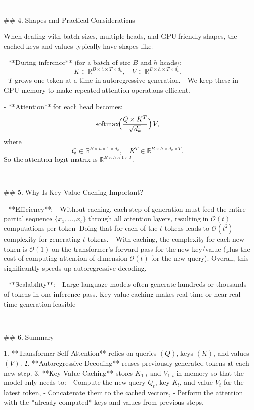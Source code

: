 ---

## 4. Shapes and Practical Considerations

When dealing with batch sizes, multiple heads, and GPU-friendly shapes, the cached keys and values typically have shapes like:

- **During inference** (for a batch of size \(B\) and \(h\) heads):
  \[
  K \in \mathbb{R}^{B \times h \times T \times d_k}, \quad
  V \in \mathbb{R}^{B \times h \times T \times d_k}.
  \]
  - \(T\) grows one token at a time in autoregressive generation.  
  - We keep these in GPU memory to make repeated attention operations efficient.

- **Attention** for each head becomes:
  \[
  \mathrm{softmax}\!\Bigl(\frac{Q \times K^T}{\sqrt{d_k}}\Bigr)\, V,
  \]
  where
  \[
  Q \in \mathbb{R}^{B \times h \times 1 \times d_k}, \quad
  K^T \in \mathbb{R}^{B \times h \times d_k \times T}.
  \]
  So the attention logit matrix is \(\mathbb{R}^{B \times h \times 1 \times T}\).

---

## 5. Why Is Key-Value Caching Important?

- **Efficiency**:  
  - Without caching, each step of generation must feed the entire partial sequence \(\{x_1, \ldots, x_t\}\) through all attention layers, resulting in \(\mathcal{O}(t)\) computations per token. Doing that for each of the \(t\) tokens leads to \(\mathcal{O}(t^2)\) complexity for generating \(t\) tokens.
  - With caching, the complexity for each new token is \(\mathcal{O}(1)\) on the transformer's forward pass for the new key/value (plus the cost of computing attention of dimension \(\mathcal{O}(t)\) for the new query). Overall, this significantly speeds up autoregressive decoding.

- **Scalability**:  
  - Large language models often generate hundreds or thousands of tokens in one inference pass. Key-value caching makes real-time or near real-time generation feasible.

---

## 6. Summary

1. **Transformer Self-Attention** relies on queries \((Q)\), keys \((K)\), and values \((V)\).
2. **Autoregressive Decoding** reuses previously generated tokens at each new step.
3. **Key-Value Caching** stores \(K_{1:t}\) and \(V_{1:t}\) in memory so that the model only needs to:
   - Compute the new query \(Q_t\), key \(K_t\), and value \(V_t\) for the latest token,
   - Concatenate them to the cached vectors,
   - Perform the attention with the *already computed* keys and values from previous steps.

